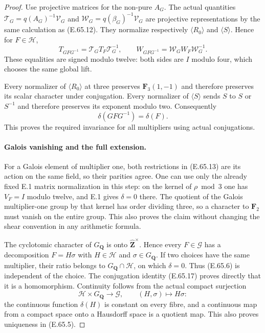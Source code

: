 \begin{proof}
Use projective matrices for the non-pure $A_G$. The actual
quantities
$\mathcal T_G=q(A_G)^{-1}\mathcal V_G$ and
$\mathcal W_G=q(\beta_G)^{-1}\mathcal V_G$ are projective
representations by the same calculation as
\textup{(E.65.12)}. They normalize respectively $\langle R_0\rangle$
and $\langle S\rangle$. Hence for $F\in\mathcal H$,
\[
 T_{GFG^{-1}}=\mathcal T_GT_F\mathcal T_G^{-1},\qquad
 W_{GFG^{-1}}=\mathcal W_GW_F\mathcal W_G^{-1}.
 \tag{E.65.16}
\]
These equalities are signed modulo twelve: both sides are $I$
modulo four, which chooses the same global lift.

Every normalizer of $\langle R_0\rangle$ at three preserves
$\mathbf F_3(1,-1)$ and therefore preserves its scalar character
under conjugation. Every normalizer of $\langle S\rangle$ sends
$S$ to $S$ or $S^{-1}$ and therefore preserves its exponent
modulo two. Consequently
\[
                         \delta(GFG^{-1})=\delta(F).
 \tag{E.65.17}
\]
This proves the required invariance for all multipliers using
actual conjugations.

\paragraph{Galois vanishing and the full extension.}
For a Galois element of multiplier one, both restrictions in
\textup{(E.65.13)} are its action on the same field, so their
parities agree. One can use only the already fixed E.1 matrix
normalization in this step: on the kernel of $\rho\bmod3$ one
has $V_F=I$ modulo twelve, and E.1 gives $\delta=0$ there.
The quotient of the Galois multiplier-one group by that kernel
has order dividing three, so a character to $\mathbf F_2$ must
vanish on the entire group. This also proves the claim without
changing the shear convention in any arithmetic formula.

The cyclotomic character of $G_{\mathbf Q}$ is onto
$\widehat{\mathbf Z}^{\times}$. Hence every $F\in\mathcal G$
has a decomposition $F=H\sigma$ with $H\in\mathcal H$ and
$\sigma\in G_{\mathbf Q}$. If two choices have the same multiplier,
their ratio belongs to $G_{\mathbf Q}\cap\mathcal H$, on which
$\delta=0$. Thus \textup{(E.65.6)} is independent of the choice.
The conjugation identity \textup{(E.65.17)} proves directly that
it is a homomorphism. Continuity follows from the actual compact
surjection
\[
       \mathcal H\times G_{\mathbf Q}\longrightarrow\mathcal G,
                           \qquad(H,\sigma)\longmapsto H\sigma:
 \tag{E.65.18}
\]
the continuous function $\delta(H)$ is constant on every fibre,
and a continuous map from a compact space onto a Hausdorff space
is a quotient map. This also proves uniqueness in
\textup{(E.65.5)}.


\end{proof}
